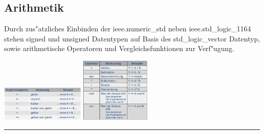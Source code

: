 	\pagebreak
	\subsection{Arithmetik}
		\begin{multicols}{2}
		Durch zus"atzliches Einbinden der ieee.numeric\_std neben ieee.std\_logic\_1164  	
		stehen signed und unsigned Datentypen auf Basis des std\_logic\_vector Datentyp, 
		sowie arithmetische Operatoren und Vergleichsfunktionen zur Verf"ugung.
		\begin{center}
			\includegraphics[width=0.3\textwidth]{pics/arithvergleich}
			\includegraphics[width=0.25\textwidth]{pics/arithoperator}
		\end{center}
	\end{multicols}
	\hrule

